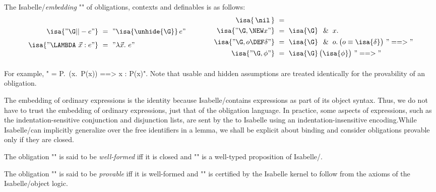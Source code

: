 \documentclass[a4paper]{easychair}
\begin{document}
\begin{defn} \label{defn:isabelle-embedding}
The Isabelle/\tlaplus \emph{embedding} "\isa{-}" of obligations,
  contexts and definables is as follows:
\begin{align*}
    \begin{aligned}
    \isa{"\G ||- e"} &\ =\  "\isa{\unhide{\G}}\, e" \\[1ex]
    \isa{"\LAMBDA\ \vec x : e"} &\ =\ "\lambda \vec x.\ e" 
    \end{aligned}
    \qquad \qquad
    \begin{aligned}
    \isa{\,\nil\,} &\ =\  \\
    \isa{"\G, \NEW x"} &\ =\  \isa{\G}\,\And x. \\
    \isa{"\G, o \DEF \delta"} &\ =\  \isa{\G}\,\And o.\,\bigl(o \equiv \isa{\delta}\bigr)\ "==>" \\
    \isa{"\G, \phi"} &\ =\  \isa{\G}\,\bigl(\isa{\phi}\bigr)\ "==>" \\[1ex]
    \end{aligned}
  \end{align*}
\end{defn}

\noindent For example, " = \And P.\ \left(\And x.\ P(x)\right) ==> \forall x : P(x)".
Note that usable and hidden assumptions are treated identically for
the provability of an obligation.

The embedding of ordinary \tlatwo expressions is the identity because
Isabelle/\tlaplus contains \tlatwo expressions as part of its object
syntax. Thus, we do not have to trust the embedding of ordinary
\tlatwo expressions, just that of the obligation language.  In
practice, some aspects of \tlatwo expressions, such as the
indentation-sensitive conjunction and disjunction lists, are sent by
the \PM to Isabelle using an indentation-insensitive
encoding.While Isabelle/\tlaplus can implicitly generalize over the free
identifiers in a lemma, we shall be explicit about binding and
consider obligations provable only if they are closed.

\begin{defn} \label{defn:wfo}
The obligation "" is said to be \emph{well-formed} iff
  it is closed and "" is a well-typed proposition of
  Isabelle/\tlaplus.
\end{defn}

\begin{defn}[Provability] \label{defn:provable}
The obligation "" is said to be \emph{provable} iff it
  is well-formed and "" is certified by the Isabelle
  kernel to follow from the axioms of the Isabelle/\tlaplus object
  logic.
\end{defn}
\end{document}
